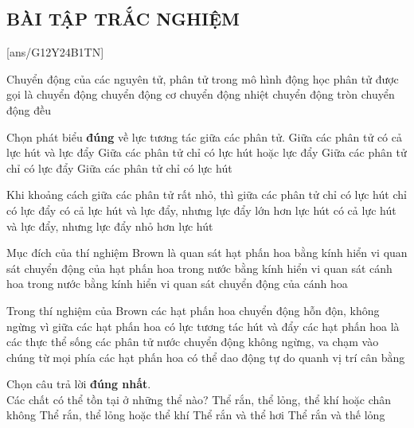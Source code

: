 \subsection{BÀI TẬP TRẮC NGHIỆM}

[ans/G12Y24B1TN]
\begin{ex}
Chuyển động của các nguyên tử, phân tử trong mô hình động học phân tử được gọi là chuyển động
\choice
{chuyển động cơ}
{\True chuyển động nhiệt}
{chuyển động tròn}
{chuyển động đều}
\loigiai{ }
\end{ex}

\begin{ex}

Chọn phát biểu \textbf{đúng} về lực tương tác giữa các phân tử.
\choice
{\True Giữa các phân tử có cả lực hút và lực đẩy}
{ Giữa các phân tử chỉ có lực hút hoặc lực đẩy}
{ Giữa các phân tử chỉ có lực đẩy}
{ Giữa các phân tử chỉ có lực hút}
\loigiai{ }
\end{ex}

\begin{ex}
Khi khoảng cách giữa các phân tử rất nhỏ, thì giữa các phân tử
\choice
{ chỉ có lực hút}
{ chỉ có lực đẩy}
{\True có cả lực hút và lực đẩy, nhưng lực đẩy lớn hơn lực hút}
{ có cả lực hút và lực đẩy, nhưng lực đẩy nhỏ hơn lực hút}
\loigiai{ }
\end{ex}


\begin{ex}
Mục đích của thí nghiệm Brown là
\choice
{ quan sát hạt phấn hoa bằng kính hiển vi}
{\True quan sát chuyển động của hạt phấn hoa trong nước bằng kính hiển vi}
{ quan sát cánh hoa trong nước bằng kính hiển vi}
{ quan sát chuyển động của cánh hoa}
\loigiai{ }
\end{ex}


\begin{ex} 
Trong thí nghiệm của Brown các hạt phấn hoa chuyển động hỗn độn, không ngừng vì
\choice
{ giữa các hạt phấn hoa có lực tương tác hút và đẩy}
{ các hạt phấn hoa là các thực thể sống}
{\True các phân tử nước chuyển động không ngừng, va chạm vào chúng từ mọi phía}
{ các hạt phấn hoa có thể dao động tự do quanh vị trí cân bằng}
\loigiai{ }
\end{ex}


\begin{ex}
Chọn câu trả lời \textbf{đúng nhất}. \\
Các chất có thể tồn tại ở những thể nào?
\choice
{ Thể rắn, thể lỏng, thể khí hoặc chân không}
{\True Thể rắn, thể lỏng hoặc thể khí}
{ Thể rắn và thể hơi}
{ Thể rắn và thế lỏng}
\loigiai{ }
\end{ex}


